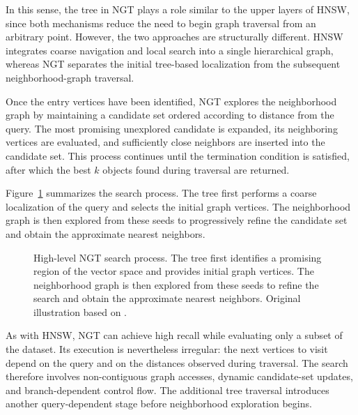 In this sense, the tree in NGT plays a role similar to the upper layers of HNSW, since both mechanisms reduce the need to begin graph traversal from an arbitrary point. However, the two approaches are structurally different. HNSW integrates coarse navigation and local search into a single hierarchical graph, whereas NGT separates the initial tree-based localization from the subsequent neighborhood-graph traversal.

Once the entry vertices have been identified, NGT explores the neighborhood graph by maintaining a candidate set ordered according to distance from the query. The most promising unexplored candidate is expanded, its neighboring vertices are evaluated, and sufficiently close neighbors are inserted into the candidate set. This process continues until the termination condition is satisfied, after which the best \(k\) objects found during traversal are returned.

Figure~\ref{fig:ngt-overview} summarizes the search process. The tree first performs a coarse localization of the query and selects the initial graph vertices. The neighborhood graph is then explored from these seeds to progressively refine the candidate set and obtain the approximate nearest neighbors.

\begin{figure}[htbp]
\centering
{}
\caption{High-level NGT search process. The tree first identifies a promising region of the vector space and provides initial graph vertices. The neighborhood graph is then explored from these seeds to refine the search and obtain the approximate nearest neighbors. Original illustration based on \cite{ngt}.}
\label{fig:ngt-overview}
\end{figure}

As with HNSW, NGT can achieve high recall while evaluating only a subset of the dataset. Its execution is nevertheless irregular: the next vertices to visit depend on the query and on the distances observed during traversal. The search therefore involves non-contiguous graph accesses, dynamic candidate-set updates, and branch-dependent control flow. The additional tree traversal introduces another query-dependent stage before neighborhood exploration begins.


